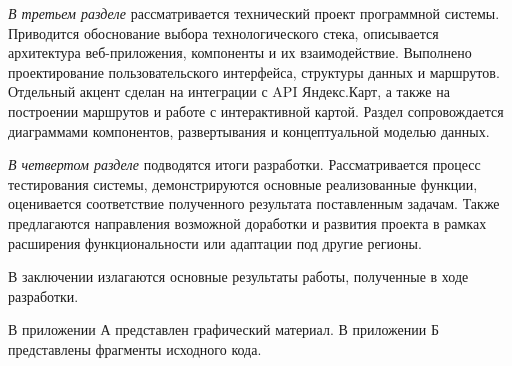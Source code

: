 \emph{В третьем разделе} рассматривается технический проект программной системы. Приводится обоснование выбора технологического стека, описывается архитектура веб-приложения, компоненты и их взаимодействие. Выполнено проектирование пользовательского интерфейса, структуры данных и маршрутов. Отдельный акцент сделан на интеграции с API Яндекс.Карт, а также на построении маршрутов и работе с интерактивной картой. Раздел сопровождается диаграммами компонентов, развертывания и концептуальной моделью данных.

\emph{В четвертом разделе} подводятся итоги разработки. Рассматривается процесс тестирования системы, демонстрируются основные реализованные функции, оценивается соответствие полученного результата поставленным задачам. Также предлагаются направления возможной доработки и развития проекта в рамках расширения функциональности или адаптации под другие регионы.

В заключении излагаются основные результаты работы, полученные в ходе разработки.

В приложении А представлен графический материал.
В приложении Б представлены фрагменты исходного кода. 
